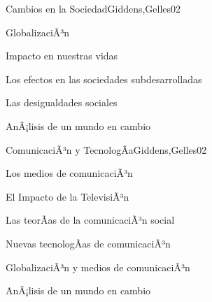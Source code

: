 \begin{syllabus}
\begin{unit}{Cambios en la Sociedad}{Giddens,Gelles}{0}{2}
    \begin{topics}
      \item GlobalizaciÃ³n
      \item Impacto en nuestras vidas
      \item Los efectos en las sociedades subdesarrolladas
      \item Las desigualdades sociales
    \end{topics}
    \begin{unitgoals}
      \item AnÃ¡lisis de un mundo en cambio
    \end{unitgoals}
\end{unit}

\begin{unit}{ComunicaciÃ³n y TecnologÃ­a}{Giddens,Gelles}{0}{2}
    \begin{topics}
      \item Los medios de comunicaciÃ³n
      \item El Impacto de la TelevisiÃ³n
      \item Las teorÃ­as de la comunicaciÃ³n social
      \item Nuevas tecnologÃ­as de comunicaciÃ³n
      \item GlobalizaciÃ³n y medios de comunicaciÃ³n
    \end{topics}
    \begin{unitgoals}
      \item AnÃ¡lisis de un mundo en cambio
    \end{unitgoals}
\end{unit}



\begin{coursebibliography}
\end{coursebibliography}

\end{syllabus}
